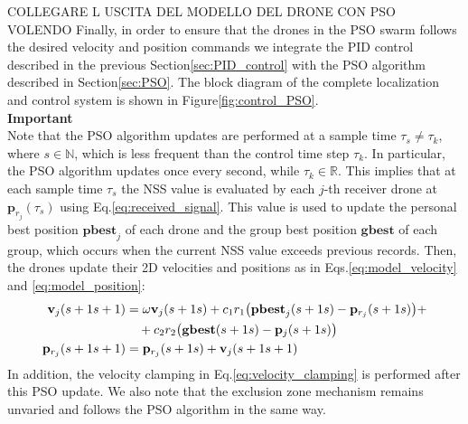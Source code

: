 COLLEGARE L USCITA DEL MODELLO DEL DRONE CON PSO VOLENDO
Finally, in order to ensure that the drones in the PSO swarm follows
the desired velocity and position commands we integrate the 
PID control described in the previous Section\ref{sec:PID_control} 
with the PSO algorithm described in Section\ref{sec:PSO}.
The block diagram of the complete localization and control 
system is shown in Figure\ref{fig:control_PSO}.
\\

\noindent
\textbf{Important}
\\
Note that the PSO algorithm updates are performed at a sample time 
$\tau_s \neq \tau_k$, where $s \in \mathbb{N}$, which is less 
frequent than the control time step $\tau_k$.
In particular, the PSO algorithm updates once every second, while 
$\tau_k \in \mathbb{R}$.
This implies that at each sample time $\tau_s$ the NSS value is 
evaluated by each $j$-th receiver drone at $\mathbf{p}_{r_j}(\tau_s)$ using 
Eq.\ref{eq:received_signal}.
This value is used to update the personal best position $\mathbf{pbest}_{j}$
of each drone and the group best position $\mathbf{gbest}$ of each group,
which occurs when the current NSS value exceeds previous records. 
Then, the drones update their 2D velocities and positions
as in Eqs.\ref{eq:model_velocity} and \ref{eq:model_position}:
\begin{align}
    \mathbf{v}_{j}(\tau_s+1) &= \omega \mathbf{v}_{j}(\tau_s) 
    + c_1 r_1 \big(\mathbf{pbest}_{j}(\tau_s) - \mathbf{p}_{r_j}(\tau_s)\big) + \notag \\
    &\quad + c_2 r_2 \big(\mathbf{gbest}(\tau_s) - \mathbf{p}_{j}(\tau_s)\big) \label{eq:model_velocity2} \\
    \mathbf{p}_{r_j}(\tau_s + 1) &= \mathbf{p}_{r_j}(\tau_s) + \mathbf{v}_{j}(\tau_s+1) \label{eq:model_position2}
\end{align}
In addition, the velocity clamping in Eq.\ref{eq:velocity_clamping} is performed after
this PSO update.
We also note that the exclusion zone mechanism remains unvaried
and follows the PSO algorithm in the same way.

